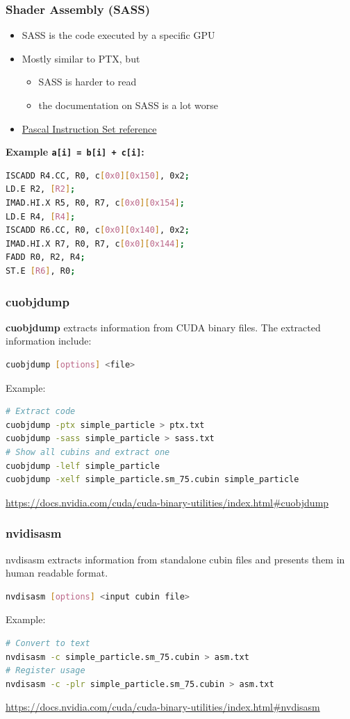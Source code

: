 \documentclass[aspectratio=169,handout]{beamer}
\begin{document}
\begin{frame}[fragile]
\frametitle{Shader Assembly (SASS)}
\begin{itemize}
\item SASS is the code executed by a specific GPU
\item Mostly similar to PTX, but
\begin{itemize}
	\item SASS is harder to read
	\item the documentation on SASS is a lot worse
\end{itemize}
\item \href{https://docs.nvidia.com/cuda/cuda-binary-utilities/index.html#maxwell-pascal}{Pascal Instruction Set reference}
\end{itemize}
\textbf{Example \texttt{a[i] = b[i] + c[i]}:}
\begin{lstlisting}[language=bash]
ISCADD R4.CC, R0, c[0x0][0x150], 0x2;
LD.E R2, [R2];              
IMAD.HI.X R5, R0, R7, c[0x0][0x154]; 
LD.E R4, [R4];            
ISCADD R6.CC, R0, c[0x0][0x140], 0x2; 
IMAD.HI.X R7, R0, R7, c[0x0][0x144];  
FADD R0, R2, R4; 
ST.E [R6], R0;    
\end{lstlisting}
\end{frame}


\begin{frame}[fragile]
	\frametitle{cuobjdump}
	\textbf{cuobjdump} extracts information from CUDA binary files. The extracted information include:
\begin{lstlisting}[language=bash]
cuobjdump [options] <file>
\end{lstlisting}
Example:
\begin{lstlisting}[language=bash]
# Extract code
cuobjdump -ptx simple_particle > ptx.txt
cuobjdump -sass simple_particle > sass.txt
# Show all cubins and extract one
cuobjdump -lelf simple_particle
cuobjdump -xelf simple_particle.sm_75.cubin simple_particle
\end{lstlisting}
\url{https://docs.nvidia.com/cuda/cuda-binary-utilities/index.html#cuobjdump}
\end{frame}

\begin{frame}[fragile]
	\frametitle{nvidisasm}
nvdisasm extracts information from standalone cubin files and presents them in human readable format. 
\begin{lstlisting}[language=bash]
nvdisasm [options] <input cubin file>
\end{lstlisting}
Example:
\begin{lstlisting}[language=bash]
# Convert to text
nvdisasm -c simple_particle.sm_75.cubin > asm.txt
# Register usage
nvdisasm -c -plr simple_particle.sm_75.cubin > asm.txt
\end{lstlisting}
\url{https://docs.nvidia.com/cuda/cuda-binary-utilities/index.html#nvdisasm}
\end{frame}
\end{document}
